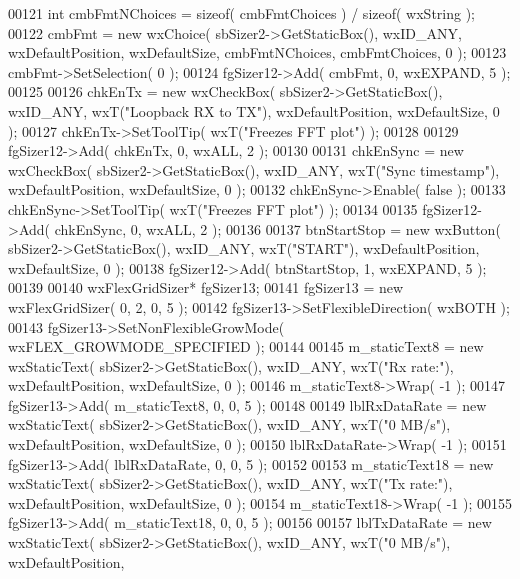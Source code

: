 \begin{DoxyCode}
00121     \textcolor{keywordtype}{int} cmbFmtNChoices = \textcolor{keyword}{sizeof}( cmbFmtChoices ) / \textcolor{keyword}{sizeof}( wxString );
00122     cmbFmt = \textcolor{keyword}{new} wxChoice( sbSizer2->GetStaticBox(), wxID\_ANY, wxDefaultPosition, wxDefaultSize, 
      cmbFmtNChoices, cmbFmtChoices, 0 );
00123     cmbFmt->SetSelection( 0 );
00124     fgSizer12->Add( cmbFmt, 0, wxEXPAND, 5 );
00125     
00126     chkEnTx = \textcolor{keyword}{new} wxCheckBox( sbSizer2->GetStaticBox(), wxID\_ANY, wxT(\textcolor{stringliteral}{"Loopback RX to TX"}), 
      wxDefaultPosition, wxDefaultSize, 0 );
00127     chkEnTx->SetToolTip( wxT(\textcolor{stringliteral}{"Freezes FFT plot"}) );
00128     
00129     fgSizer12->Add( chkEnTx, 0, wxALL, 2 );
00130     
00131     chkEnSync = \textcolor{keyword}{new} wxCheckBox( sbSizer2->GetStaticBox(), wxID\_ANY, wxT(\textcolor{stringliteral}{"Sync timestamp"}), 
      wxDefaultPosition, wxDefaultSize, 0 );
00132     chkEnSync->Enable( \textcolor{keyword}{false} );
00133     chkEnSync->SetToolTip( wxT(\textcolor{stringliteral}{"Freezes FFT plot"}) );
00134     
00135     fgSizer12->Add( chkEnSync, 0, wxALL, 2 );
00136     
00137     btnStartStop = \textcolor{keyword}{new} wxButton( sbSizer2->GetStaticBox(), wxID\_ANY, wxT(\textcolor{stringliteral}{"START"}), wxDefaultPosition, 
      wxDefaultSize, 0 );
00138     fgSizer12->Add( btnStartStop, 1, wxEXPAND, 5 );
00139     
00140     wxFlexGridSizer* fgSizer13;
00141     fgSizer13 = \textcolor{keyword}{new} wxFlexGridSizer( 0, 2, 0, 5 );
00142     fgSizer13->SetFlexibleDirection( wxBOTH );
00143     fgSizer13->SetNonFlexibleGrowMode( wxFLEX\_GROWMODE\_SPECIFIED );
00144     
00145     m_staticText8 = \textcolor{keyword}{new} wxStaticText( sbSizer2->GetStaticBox(), wxID\_ANY, wxT(\textcolor{stringliteral}{"Rx rate:"}), 
      wxDefaultPosition, wxDefaultSize, 0 );
00146     m_staticText8->Wrap( -1 );
00147     fgSizer13->Add( m_staticText8, 0, 0, 5 );
00148     
00149     lblRxDataRate = \textcolor{keyword}{new} wxStaticText( sbSizer2->GetStaticBox(), wxID\_ANY, wxT(\textcolor{stringliteral}{"0 MB/s"}), wxDefaultPosition,
       wxDefaultSize, 0 );
00150     lblRxDataRate->Wrap( -1 );
00151     fgSizer13->Add( lblRxDataRate, 0, 0, 5 );
00152     
00153     m_staticText18 = \textcolor{keyword}{new} wxStaticText( sbSizer2->GetStaticBox(), wxID\_ANY, wxT(\textcolor{stringliteral}{"Tx rate:"}), 
      wxDefaultPosition, wxDefaultSize, 0 );
00154     m_staticText18->Wrap( -1 );
00155     fgSizer13->Add( m_staticText18, 0, 0, 5 );
00156     
00157     lblTxDataRate = \textcolor{keyword}{new} wxStaticText( sbSizer2->GetStaticBox(), wxID\_ANY, wxT(\textcolor{stringliteral}{"0 MB/s"}), wxDefaultPosition,

\end{DoxyCode}

